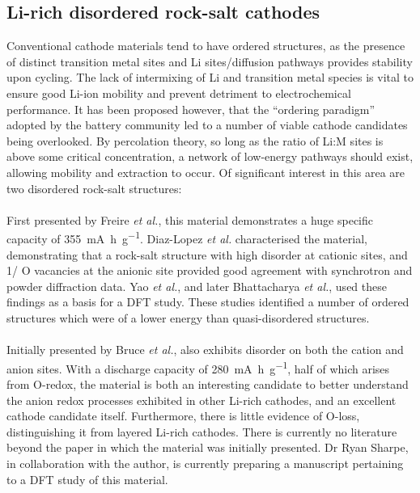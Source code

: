 \subsection{Li-rich disordered rock-salt cathodes}
Conventional cathode materials tend to have ordered structures, as the presence of distinct transition metal sites and Li sites/diffusion pathways provides stability upon cycling.
The lack of intermixing of Li and transition metal species is vital to ensure good Li-ion mobility and prevent detriment to electrochemical performance.
It has been proposed however, that the ``ordering paradigm'' adopted by the battery community led to a number of viable cathode candidates being overlooked. \cite{Casimir2014}
By percolation theory, so long as the ratio of Li:M sites is above some critical concentration, a network of low-energy pathways should exist, allowing mobility and extraction to occur.\cite{Urban2014}
Of significant interest in this area are two disordered rock-salt structures:

\paragraph{}
First presented by Freire \textit{et al.},\cite{Freire2016} this material demonstrates a huge specific capacity of \SI{355}{\milli\ampere\hour\per\gram}.
Diaz-Lopez \textit{et al.}\cite{Diaz-Lopez2018} characterised the material, demonstrating that a  rock-salt structure with high  disorder at cationic sites, and 1/ O vacancies at the anionic site provided good agreement with synchrotron and powder diffraction data.
Yao \textit{et al.}\cite{Diaz-Lopez2017}, and later Bhattacharya \textit{et al.}, used these findings as a basis for a DFT study.
These studies identified a number of ordered structures which were of a lower energy than quasi-disordered structures.

\paragraph{}
Initially presented by Bruce \textit{et al.},\cite{House2018}  also exhibits disorder on both the cation and anion sites.
With a discharge capacity of \SI{280}{\milli\ampere\hour\per\gram}, half of which arises from O-redox, the material is both an interesting candidate to better understand the anion redox processes exhibited in other Li-rich cathodes, and an excellent cathode candidate itself.
Furthermore, there is little evidence of O-loss, distinguishing it from layered Li-rich cathodes.
There is currently no literature beyond the paper in which the material was initially presented. 
Dr Ryan Sharpe, in collaboration with the author, is currently preparing a manuscript pertaining to a DFT study of this material.

